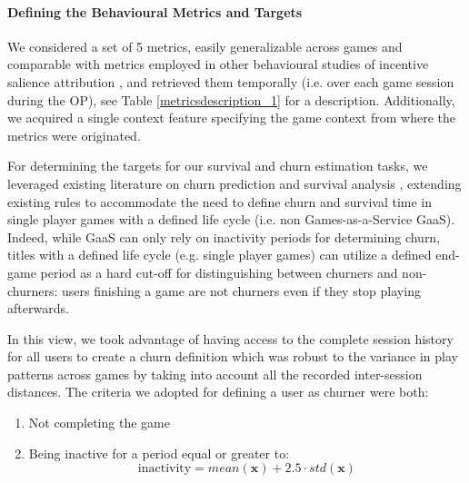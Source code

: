 \paragraph*{Defining the Behavioural Metrics and Targets}
\label{behavioural_metric_targets_1}
We considered a set of 5 metrics, easily generalizable across games and comparable with metrics employed in other behavioural studies of incentive salience attribution \cite{berridge1998role,mcclure2003computational,zhang2009neural}, and retrieved them temporally  (i.e. over each game session during the OP), see Table \ref{metricsdescription_1} for a description. Additionally, we acquired a single context feature specifying the game context from where the metrics were originated. 

For determining the targets for our survival and churn estimation tasks, we leveraged existing literature on churn prediction \cite{drachen2016rapid, milovsevic2017early, lee2018game, perianez2016churn, runge2014churn, kim2017churn, hadiji2014predicting, xie2015predicting} and survival analysis \cite{viljanen2018playtime, demediuk2018player, lee2018game, bertens2017games}, extending existing rules to accommodate the need to define churn and survival time in single player games with a defined life cycle (i.e. non Games-as-a-Service GaaS). Indeed, while GaaS can only rely on inactivity periods for determining churn, titles with a defined life cycle (e.g. single player games) can utilize a defined end-game period as a hard cut-off for distinguishing between churners and non-churners: users finishing a game are not churners even if they stop playing afterwards. 

In this view, we took advantage of having access to the complete session history for all users to create a churn definition which was robust to the variance in play patterns across games by taking into account all the recorded inter-session distances. The criteria we adopted for defining a user as churner were both: 

\begin{enumerate}
    \item Not completing the game
    \item Being inactive for a period equal or greater to:
        \begin{equation}
            \label{inactivityrule}
            \text{inactivity} = 
            mean(\mathbf{x}) + 2.5 \cdot std(\mathbf{x})
        \end{equation}
\end{enumerate}

